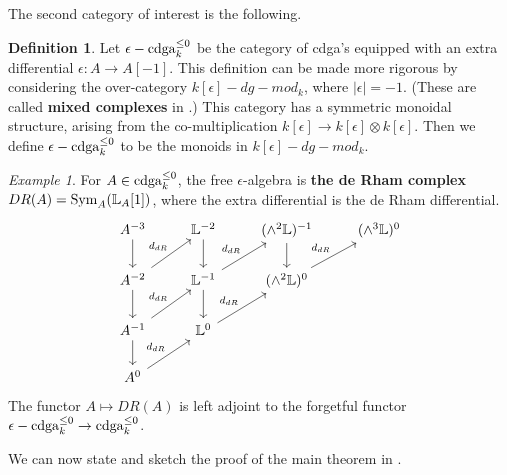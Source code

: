 \documentclass[10pt,a4paper,reqno,oneside]{book} %
\theoremstyle{plain}
\theoremstyle{definition}
\newtheorem{defin}[thm]{Definition}
\theoremstyle{remark}
\newtheorem{eg}[thm]{Example}
\numberwithin{equation}{section}
\begin{document}
The second category of interest is the following.

\begin{defin}
Let $\epsilon-\operatorname{cdga}_k^{\leq 0}$ be the category of cdga's equipped with an extra differential $\epsilon : A \to A[-1]$. This
definition can be made more rigorous by considering the over-category $k[\epsilon] - dg-mod_k$, where $|\epsilon| = -1$. (These
are called \textbf{mixed complexes} in \cite{PTVV}.)
This category has a symmetric monoidal structure, arising from the co-multiplication $k[\epsilon] \to k[\epsilon]
\otimes k[\epsilon]$. Then we define $\epsilon-\operatorname{cdga}_k^{\leq 0}$ to be the monoids in $k[\epsilon] - dg-mod_k$.
\end{defin}

\begin{eg}
\label{eg:de_rham}
For $A \in \operatorname{cdga}_k^{\leq 0}$, the free $\epsilon$-algebra is \textbf{the de Rham complex} $DR(A) = \operatorname{Sym}_A(\mathbb L_A[1])$,
where the extra differential is the de Rham differential.
\[
\begin{tikzcd}
A^{-3}\arrow{d} & \bbL^{-2}\arrow{d} & (\wedge^2 \bbL)^{-1}\arrow{d} & (\wedge^3 \bbL)^0 \\
A^{-2}\arrow{d}\arrow{ur}{d_{dR}} & \bbL^{-1}\arrow{d}\arrow{ur}{d_{dR}} & (\wedge^2 \bbL)^{0}\arrow{ur}{d_{dR}} & \\
A^{-1}\arrow{d}\arrow{ur}{d_{dR}} & \bbL^0\arrow{ur}{d_{dR}} & & \\
A^0\arrow{ur}{d_{dR}} & & &
\end{tikzcd}
\]
The functor $A \mapsto DR(A)$ is left adjoint to the forgetful functor $\epsilon-\operatorname{cdga}_k^{\leq 0}
\to \operatorname{cdga}_k^{\leq 0}$.
\end{eg}

We can now state and sketch the proof of the main theorem in \cite{TV_HKR}.
\end{document}
